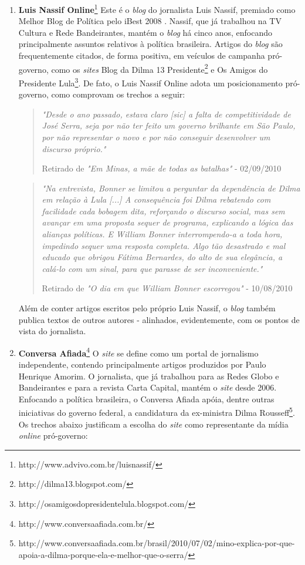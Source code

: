 \begin{enumerate}

\item \textbf{Luis Nassif Online}\footnote{http://www.advivo.com.br/luisnassif/} Este é o \emph{blog} do jornalista Luis Nassif, premiado como Melhor Blog de Política pelo iBest 2008 \cite{ibest}. Nassif, que já trabalhou na TV Cultura e Rede Bandeirantes, mantém o \emph{blog} há cinco anos, enfocando principalmente assuntos relativos à política brasileira. Artigos do \emph{blog} são frequentemente citados, de forma positiva, em veículos de campanha pró-governo, como os \emph{sites} Blog da Dilma 13 Presidente\footnote{http://dilma13.blogspot.com/} e Os Amigos do Presidente Lula\footnote{http://osamigosdopresidentelula.blogspot.com/}. De fato, o Luis Nassif Online adota um posicionamento pró-governo, como comprovam os trechos a seguir:

\begin{quote}
\emph{"Desde o ano passado, estava claro [sic] a falta de competitividade de José Serra, seja por não ter feito um governo brilhante em São Paulo, por não representar o novo e por não conseguir desenvolver um discurso próprio."}

{\small Retirado de \emph{"Em Minas, a mãe de todas as batalhas"} - 02/09/2010} 
\end{quote}

\begin{quote}

\emph{"Na entrevista, Bonner se limitou a perguntar da dependência de Dilma em relação à Lula [...] A consequência foi Dilma rebatendo com facilidade cada bobagem dita, reforçando o discurso social, mas sem avançar em uma proposta sequer de programa, explicando a lógica das alianças políticas. E William Bonner interrompendo-a a toda hora, impedindo sequer uma resposta completa. Algo tão desastrado e mal educado que obrigou Fátima Bernardes, do alto de sua elegância, a calá-lo com um sinal, para que parasse de ser inconveniente."}

{ \small Retirado de \emph{"O dia em que William Bonner escorregou"} - 10/08/2010}

\end{quote}

Além de conter artigos escritos pelo próprio Luis Nassif, o \emph{blog} também publica textos de outros autores - alinhados, evidentemente, com os pontos de vista do jornalista.   

\item \textbf{Conversa Afiada}\footnote{http://www.conversaafiada.com.br/} O \emph{site} se define como um portal de jornalismo independente, contendo principalmente artigos produzidos por Paulo Henrique Amorim. O jornalista, que já trabalhou para as Redes Globo e Bandeirantes e para a revista Carta Capital, mantém o \emph{site} desde 2006. Enfocando a política brasileira, o Conversa Afiada apóia, dentre outras iniciativas do governo federal, a candidatura da ex-ministra Dilma Rousseff\footnote{http://www.conversaafiada.com.br/brasil/2010/07/02/mino-explica-por-que-apoia-a-dilma-porque-ela-e-melhor-que-o-serra/}. Os trechos abaixo justificam a escolha do \emph{site} como representante da mídia \emph{online} pró-governo:


\end{enumerate}
